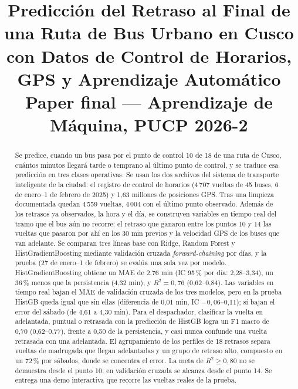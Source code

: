 \documentclass[conference,spanish]{IEEEtran}
\begin{document}
\title{Predicción del Retraso al Final de una Ruta de Bus Urbano en Cusco con Datos de Control de Horarios, GPS y Aprendizaje Automático\\
\large Paper final --- Aprendizaje de Máquina, PUCP 2026-2}

\author{
}

\maketitle

\begin{abstract}
Se predice, cuando un bus pasa por el punto de control 10 de 18 de una ruta de Cusco, cuántos minutos llegará tarde o temprano al último punto de control, y se traduce esa predicción en tres clases operativas. Se usan los dos archivos del sistema de transporte inteligente de la ciudad: el registro de control de horarios (4\,707 vueltas de 45 buses, 6 de enero--1 de febrero de 2025) y 1,63 millones de posiciones GPS. Tras una limpieza documentada quedan 4\,559 vueltas, 4\,004 con el último punto observado. Además de los retrasos ya observados, la hora y el día, se construyen variables en tiempo real del tramo que el bus aún no recorre: el retraso que ganaron entre los puntos 10 y 14 las vueltas que pasaron por ahí en los 30 min previos y la velocidad GPS de los buses que van adelante. Se comparan tres líneas base con Ridge, Random Forest y HistGradientBoosting mediante validación cruzada \textit{forward-chaining} por días, y la prueba (27 de enero--1 de febrero) se evalúa una sola vez por modelo. HistGradientBoosting obtiene un MAE de 2,76 min (IC 95\,\% por día: 2,28--3,34), un 36\,\% menos que la persistencia (4,32 min), y $R^2=0{,}76$ (0,62--0,84). Las variables en tiempo real bajan el MAE de validación cruzada de los tres modelos, pero en la prueba HistGB queda igual que sin ellas (diferencia de 0,01 min, IC $-0{,}06$--0,11); sí bajan el error del sábado (de 4,61 a 4,30 min). Para el despachador, clasificar la vuelta en adelantada, puntual o retrasada con la predicción de HistGB logra un F1 macro de 0,70 (0,62--0,77), frente a 0,50 de la persistencia, y casi nunca confunde una vuelta retrasada con una adelantada. El agrupamiento de los perfiles de 18 retrasos separa vueltas de madrugada que llegan adelantadas y un grupo de retraso alto, compuesto en un 72\,\% por sábados, donde se concentra el error. La meta de $R^2\ge0{,}80$ no se demuestra desde el punto 10; en validación cruzada se alcanza desde el punto 14. Se entrega una demo interactiva que recorre las vueltas reales de la prueba.
\end{abstract}
\end{document}
